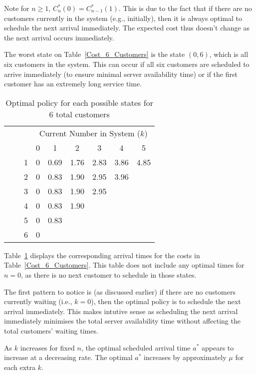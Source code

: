 Note for $n \geq 1$, $C_{n}^{*} (0) = C_{n - 1}^{*} (1)$. This is due to the fact that if there are no customers currently in the system (e.g., initially), then it is always optimal to schedule the next arrival immediately. The expected cost thus doesn't change as the next arrival occurs immediately.

The worst state on Table~\ref{Cost_6_Customers} is the state $(0, 6)$, which is all six customers in the system. This can occur if all six customers are scheduled to arrive immediately (to ensure minimal server availability time) or if the first customer has an extremely long service time.

\begin{table}[htb]
	\centering
	\begin{tabular}{c c c || c | c | c | c | c | c}
		& & & \multicolumn{6}{c}{Current Number in System ($k$)} \\
		& & & 0 & 1 & 2 & 3 & 4 & 5 \\ \hline \hline
		\parbox[t]{2mm}{} & \parbox[t]{2mm}{} & 1 & 0 & 0.69 & 1.76 & 2.83 & 3.86 & 4.85 \\
		& & 2 & 0 & 0.83 & 1.90 & 2.95 & 3.96 \\
		& & 3 & 0 & 0.83 & 1.90 & 2.95 & \\
		& & 4 & 0 & 0.83 & 1.90 & & \\
		& & 5 & 0 & 0.83 & & & \\
		& & 6 & 0 & & & &
	\end{tabular}
	\caption{Optimal policy for each possible states for 6 total customers}
	\label{Policy_6_Customers}
\end{table}

Table~\ref{Policy_6_Customers} displays the corresponding arrival times for the costs in Table~\ref{Cost_6_Customers}. This table does not include any optimal times for $n = 0$, as there is no next customer to schedule in those states.

The first pattern to notice is (as discussed earlier) if there are no customers currently waiting (i.e., $k = 0$), then the optimal policy is to schedule the next arrival immediately. This makes intutive sense as scheduling the next arrival immediately minimises the total server availability time without affecting the total customers' waiting times.

As $k$ increases for fixed $n$, the optimal scheduled arrival time $a^{*}$ appears to increase at a decreasing rate. The optimal $a^{*}$ increases by approximately $\mu$ for each extra $k$.

